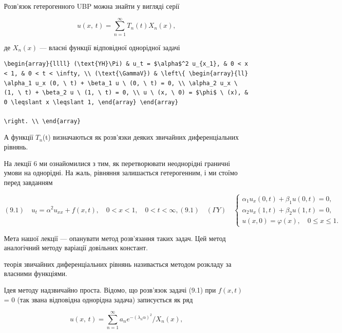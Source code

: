 \documentclass[
  ukrainian,
]{article}
\begin{document}
Розв'язок гетерогенного UBP можна знайти у вигляді серії

\[
u\left( x,\ t\right) =\sum_{n=1}^{\infty}T_{n}\left( t\right) X_{n}\left( x\right) ,
\]

де \(X_n\left(x\right)\) --- власні функції відповідної однорідної
задачі

\begin{verbatim}
\begin{array}{llll} (\text{YH}\Pi) & u_t = $\alpha$^2 u_{x_1}, & 0 < x < 1, & 0 < t < \infty, \\ (\text{\GammaV}) & \left\{ \begin{array}{ll} \alpha_1 u_x (0, \ t) + \beta_1 u \ (0, \ t) = 0, \\ \alpha_2 u_x \ (1, \ t) + \beta_2 u \ (1, \ t) = 0, \\ u \ (x, \ 0) = $\phi$ \ (x), & 0 \leqslant x \leqslant 1, \end{array} \end{array}

\right. \\ \end{array}
\end{verbatim}

А функції \(T_n\)(t) визначаються як розв'язки деяких звичайних
диференціальних рівнянь.

На лекції 6 ми ознайомилися з тим, як перетворювати неоднорідні граничні
умови на однорідні. На жаль, рівняння залишається гетерогенним, і ми
стоїмо перед завданням

\[
(9.1) \quad u_{t} = \alpha^{2} u_{xx} + f(x, t), \quad 0 < x < 1, \quad 0 < t < \infty,
(9.1) \quad (\Gamma Y) \quad
\begin{cases} \alpha_{1} u_{x}(0, t) + \beta_{1} u(0, t) = 0, \\ \alpha_{2} u_{x}(1, t) + \beta_{2} u(1, t) = 0, \\ u(x, 0) = \varphi(x), \quad 0 \le x \le 1. \end{cases}
\]

Мета нашої лекції --- опанувати метод розв'язання таких задач. Цей метод
аналогічний методу варіації довільних констант.

теорія звичайних диференціальних рівнянь називається методом розкладу за
власними функціями.

Ідея методу надзвичайно проста. Відомо, що розв'язок задачі (9.1) при
\(f(x, t)\) = 0 (так звана відповідна однорідна задача) записується як
ряд

\[
u\left(x,\ t\right)=\sum_{n=1}^{\infty}a_{n}e^{-\left(\lambda_{n}\alpha\right)^{2}}/X_{n}\left(x\right),
\]
\end{document}
